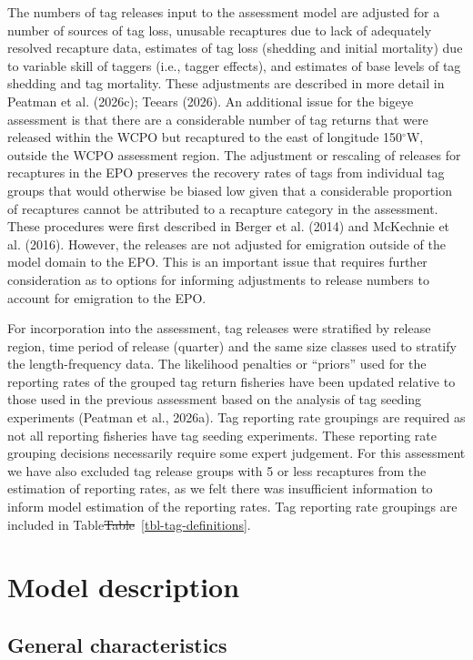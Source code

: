 \documentclass[
  english,
  a4paper,
  a4paper,
  11pt]{SCreport}
\providecommand{\DIFdel}[1]{{\protect\color{red}\sout{#1}}}                      %
\providecommand{\DIFdelbegin}{} %
\providecommand{\DIFdelend}{} %
\newcommand{\DIFscaledelfig}{0.5}
\newlength{\DIFdelgraphicswidth} %
\newlength{\DIFdelgraphicsheight} %
\newcommand{\DIFdelincludegraphics}[2][]{%
\sbox{\DIFdelgraphicsbox}{\DIFOincludegraphics[#1]{#2}}%
\settoboxwidth{\DIFdelgraphicswidth}{\DIFdelgraphicsbox} %
\settoboxtotalheight{\DIFdelgraphicsheight}{\DIFdelgraphicsbox} %
\scalebox{\DIFscaledelfig}{%
\parbox[b]{\DIFdelgraphicswidth}{\usebox{\DIFdelgraphicsbox}\\[-\baselineskip] \rule{\DIFdelgraphicswidth}{0em}}\llap{\resizebox{\DIFdelgraphicswidth}{\DIFdelgraphicsheight}{%
\setlength{\unitlength}{\DIFdelgraphicswidth}%
\begin{picture}(1,1)%
\thicklines\linethickness{2pt} %
{\color[rgb]{1,0,0}\put(0,0){\framebox(1,1){}}}%
{\color[rgb]{1,0,0}\put(0,0){\line( 1,1){1}}}%
{\color[rgb]{1,0,0}\put(0,1){\line(1,-1){1}}}%
\end{picture}%
}\hspace*{3pt}}} %
} %
\DeclareRobustCommand{\DIFdelbegin}{\DIFOdelbegin \let\includegraphics\DIFdelincludegraphics} %
\DeclareRobustCommand{\DIFdelend}{\DIFOaddend \let\includegraphics\DIFOincludegraphics} %
\begin{document}
The numbers of tag releases input to the assessment model are adjusted
for a number of sources of tag loss, unusable recaptures due to lack of
adequately resolved recapture data, estimates of tag loss (shedding and
initial mortality) due to variable skill of taggers (i.e., tagger
effects), and estimates of base levels of tag shedding and tag
mortality. These adjustments are described in more detail in Peatman et
al. (2026c); Teears (2026). An additional issue for the bigeye
assessment is that there are a considerable number of tag returns that
were released within the WCPO but recaptured to the east of longitude
150\(^\circ\)W, outside the WCPO assessment region. The adjustment or
rescaling of releases for recaptures in the EPO preserves the recovery
rates of tags from individual tag groups that would otherwise be biased
low given that a considerable proportion of recaptures cannot be
attributed to a recapture category in the assessment. These procedures
were first described in Berger et al. (2014) and McKechnie et al.
(2016). However, the releases are not adjusted for emigration outside of
the model domain to the EPO. This is an important issue that requires
further consideration as to options for informing adjustments to release
numbers to account for emigration to the EPO.

For incorporation into the assessment, tag releases were stratified by
release region, time period of release (quarter) and the same size
classes used to stratify the length-frequency data. The likelihood
penalties or ``priors'' used for the reporting rates of the grouped tag
return fisheries have been updated relative to those used in the
previous assessment based on the analysis of tag seeding experiments
(Peatman et al., 2026a). Tag reporting rate groupings are required as
not all reporting fisheries have tag seeding experiments. These
reporting rate grouping decisions necessarily require some expert
judgement. For this assessment we have also excluded tag release groups
with 5 or less recaptures from the estimation of reporting rates, as we
felt there was insufficient information to inform model estimation of
the reporting rates. Tag reporting rate groupings are included in
Table\DIFdelbegin \DIFdel{Table}\DIFdelend ~\ref{tbl-tag-definitions}.

\section{Model description}\label{sec-model-description}

\subsection{General characteristics}\label{general-characteristics-1}
\end{document}
